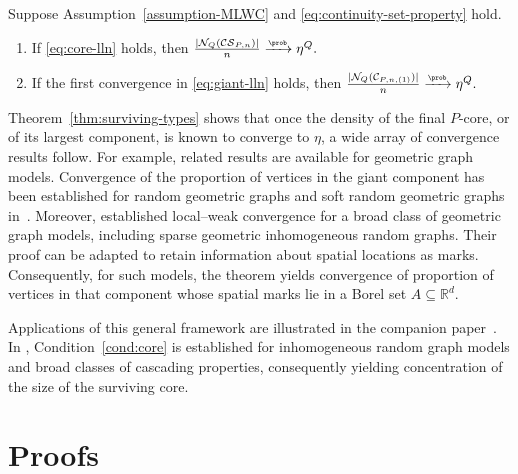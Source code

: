 \documentclass[11pt]{article}
\theoremstyle{plain}
\begin{document}
\begin{theorem}
\label{thm:surviving-types}
Suppose Assumption~\ref{assumption-MLWC} and \eqref{eq:continuity-set-property} hold.
\begin{enumerate}
\item If \eqref{eq:core-lln} holds, then
\(
\frac{|\mathcal N_Q(\mathcal{CS}_{P,n})|}{n}
\xrightarrow{\scriptscriptstyle\prob}\eta^Q.
\)
\item If the first convergence in \eqref{eq:giant-lln} holds, then
\(
\frac{|\mathcal N_Q(\mathcal C_{P,n,(1)})|}{n}
\xrightarrow{\scriptscriptstyle\prob}\eta^Q.
\)
\end{enumerate}
\end{theorem}

\begin{remark}
    Theorem~\ref{thm:surviving-types} shows that once the density of the final $P$-core, or of its largest component, is known to converge to $\eta$, a wide array of convergence results follow. For example, related results are available for geometric graph models. Convergence of the proportion of vertices in the giant component has been established for random geometric graphs and soft random geometric graphs in~\cite{Penrose2003,Penrose2022}. Moreover, \cite{HHM23} established local--weak convergence for a broad class of geometric graph models, including sparse geometric inhomogeneous random graphs. Their proof can be adapted to retain information about spatial locations as marks.
    Consequently, for such models, the theorem yields convergence of proportion of vertices in that component whose spatial marks lie in a Borel set $A\subseteq\mathbb{R}^d$.
\end{remark}


\begin{remark}
Applications of this general framework are illustrated in the companion paper~\cite{ChatterjeeDharaSchulman2026}. In \cite{ChatterjeeDharaSchulman2026}, Condition~\ref{cond:core} is established for inhomogeneous random graph models and broad classes of cascading properties, consequently yielding concentration of the size of the surviving core.
\end{remark}

\section{Proofs}
\end{document}
